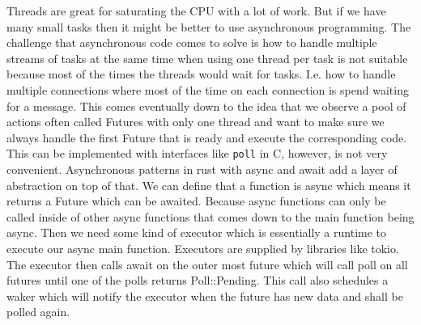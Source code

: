 Threads are great for saturating the CPU with a lot of work. But if we have many small tasks then it might be better to use asynchronous programming. The challenge that asynchronous code comes to solve is how to handle multiple streams of tasks at the same time when using one thread per task is not suitable because most of the times the threads would wait for tasks. I.e. how to handle multiple connections where most of the time on each connection is spend waiting for a message. This comes eventually down to the idea that we observe a pool of actions often called Futures with only one thread and want to make sure we always handle the first Future that is ready and execute the corresponding code. This can be implemented with interfaces like \lstinline{poll} in C, however, is not very convenient. Asynchronous patterns in rust with async and await add a layer of abstraction on top of that. We can define that a function is async which means it returns a Future which can be awaited. Because async functions can only be called inside of other async functions that comes down to the main function being async. Then we need some kind of executor which is essentially a runtime to execute our async main function. Executors are supplied by libraries like tokio. The executor then calls await on the outer most future which will call poll on all futures until one of the polls returns Poll::Pending. This call also schedules a waker which will notify the executor when the future has new data and shall be polled again.